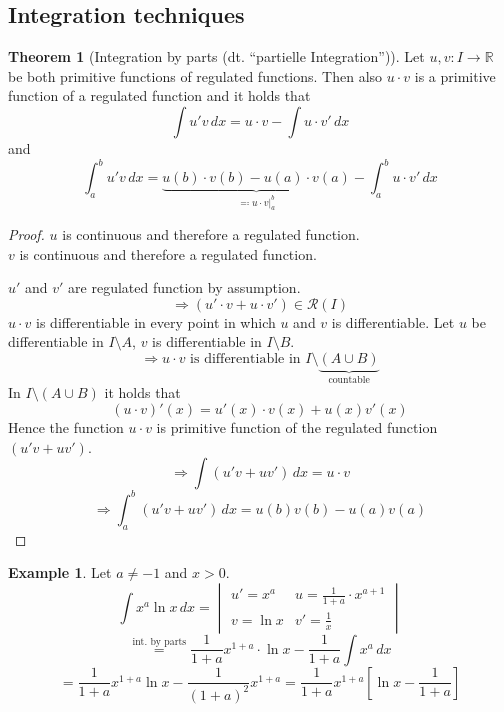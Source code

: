\documentclass[a4paper,landscape,twocolumn]{article}
\theoremstyle{definition}
\newtheorem{theorem}{Theorem}
\newtheorem{ex}{Example}
\begin{document}
\subsection{Integration techniques}
%
\begin{theorem}[Integration by parts (dt. \enquote{\foreignlanguage{ngerman}{partielle Integration}})]
  Let $u,v: I \to \mathbb R$ be both primitive functions of regulated functions.
  Then also $u \cdot v$ is a primitive function of a regulated function and it holds that
  \[ \int u' v \, dx = u \cdot v - \int u \cdot v' \, dx \]
  and
  \[ \int_a^b u' v \, dx = \underbrace{u(b) \cdot v(b) - u(a) \cdot v(a)}_{\eqqcolon u \cdot v |_a^b} - \int_a^b u \cdot v' \, dx \]
\end{theorem}
\begin{proof}
  $u$ is continuous and therefore a regulated function. \\
  $v$ is continuous and therefore a regulated function.

  $u'$ and $v'$ are regulated function by assumption.
  \[ \Rightarrow (u' \cdot v + u \cdot v') \in \mathcal R(I) \]
  $u \cdot v$ is differentiable in every point in which $u$ and $v$ is differentiable.
  Let $u$ be differentiable in $I \setminus A$, $v$ is differentiable in $I \setminus B$.
  \[ \Rightarrow u \cdot v \text{ is differentiable in } I \setminus \underbrace{(A \cup B)}_{\text{countable}} \]
  In $I \setminus (A \cup B)$ it holds that
  \[ (u \cdot v)'(x) = u'(x) \cdot v(x) + u(x) v'(x) \]
  Hence the function $u \cdot v$ is primitive function of the regulated function $(u' v + u v')$.
  \[ \Rightarrow \int (u' v + uv') \, dx = u \cdot v \]
  \[ \Rightarrow \int_a^b (u' v + uv') \, dx = u(b) v(b) - u(a) v(a) \]
\end{proof}

\begin{ex}
  Let $a \neq -1$ and $x > 0$.
  \[
    \int x^a \ln{x} \, dx = \begin{vmatrix}
      u' = x^a     & u = \frac1{1+a} \cdot x^{a+1} \\
      v = \ln{x}   & v' = \frac{1}{x}
    \end{vmatrix}
  \] \[
    \overset{\text{int. by parts}}{=} \frac{1}{1+a} x^{1+a} \cdot \ln{x} - \frac{1}{1+a} \int x^a \, dx
  \] \[
    = \frac{1}{1+a} x^{1+a} \ln{x} - \frac{1}{(1 + a)^2} x^{1+a}
    = \frac{1}{1+a} x^{1+a} \left[\ln{x} - \frac{1}{1 + a}\right]
  \]
\end{ex}
\end{document}
